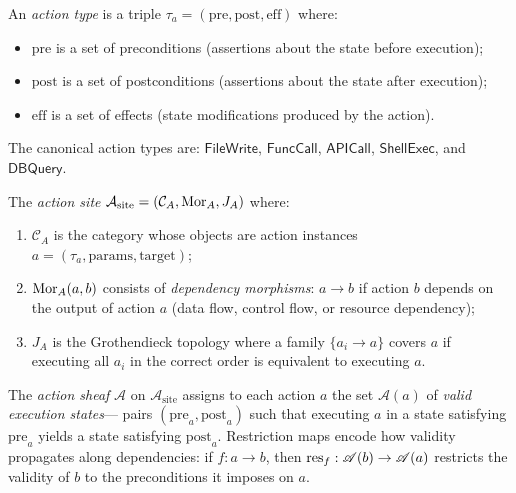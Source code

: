 \documentclass[11pt]{article}
\newcommand{\ActionSite}{\mathcal{A}_{\mathrm{site}}}
\newcommand{\ActionSheaf}{\mathscr{A}}
\newcommand{\ActionType}{\tau_a}
\newcommand{\PreCond}{\mathrm{pre}}
\newcommand{\PostCond}{\mathrm{post}}
\newcommand{\Effect}{\mathrm{eff}}
\begin{document}
\begin{definition}\label{def:action-type}
An \emph{action type} is a triple
$\ActionType = (\PreCond, \PostCond, \Effect)$ where:
\begin{itemize}
  \item $\PreCond$ is a set of preconditions (assertions about the state
    before execution);
  \item $\PostCond$ is a set of postconditions (assertions about the state
    after execution);
  \item $\Effect$ is a set of effects (state modifications produced by
    the action).
\end{itemize}
The canonical action types are: $\mathsf{FileWrite}$, $\mathsf{FuncCall}$,
$\mathsf{APICall}$, $\mathsf{ShellExec}$, and $\mathsf{DBQuery}$.
\end{definition}

\begin{definition}\label{def:action-site-formal}
The \emph{action site} $\ActionSite = (\mathcal{C}_A, \Mor_A, J_A)$ where:
\begin{enumerate}[label=(\alph*)]
  \item $\mathcal{C}_A$ is the category whose objects are action instances
    $a = (\ActionType, \mathrm{params}, \mathrm{target})$;
  \item $\mathrm{Mor}_A(a, b)$ consists of \emph{dependency morphisms}: $a \to b$
    if action $b$ depends on the output of action $a$ (data flow,
    control flow, or resource dependency);
  \item $J_A$ is the Grothendieck topology where a family
    $\{a_i \to a\}$ covers $a$ if executing all $a_i$ in the correct
    order is equivalent to executing $a$.
\end{enumerate}
\end{definition}

\begin{definition}\label{def:action-sheaf}
The \emph{action sheaf} $\ActionSheaf$ on $\ActionSite$ assigns to each
action $a$ the set $\ActionSheaf(a)$ of \emph{valid execution states}---
pairs $(\PreCond_a, \PostCond_a)$ such that executing $a$ in a state
satisfying $\PreCond_a$ yields a state satisfying $\PostCond_a$.
Restriction maps encode how validity propagates along dependencies:
if $f : a \to b$, then $\res_f : \ActionSheaf(b) \to \ActionSheaf(a)$
restricts the validity of $b$ to the preconditions it imposes on $a$.
\end{definition}
\end{document}
